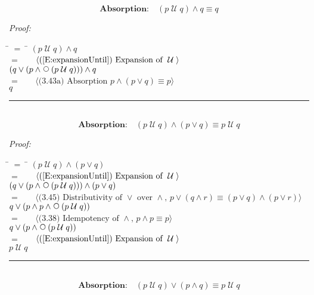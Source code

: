 \documentclass[fleqn, leqno]{article}
\newcommand{\lgap}{2pt}                             %
\newcommand{\mymathindent}{24pt}                    %
\newcommand{\Until}{\;\mathcal{U}\;}
\newcommand{\Next}{\;\,\text{\raisebox{3.5pt}{\circle{6}}}}
\newcommand{\myqed}{\hfill\rule[-.23ex]{1.2ex}{2.0ex}}
\newcommand{\Gll} {\langle}                         %
\newcommand{\Ggg} {\rangle}                         %
\newcommand{\Hint}[1]     {\ \ \ $\Gll              \mbox{#1} \Ggg$ }   %
\begin{document}
\begin{equation}\label{E:untilAndQ}
\textbf{Absorption:}\quad (p \Until q) \land q \equiv q
\end{equation}

\emph{Proof:}
\begin{tabbing}
\hspace{\mymathindent} \= $= \;$ \= \kill
  \> \>   $(p \Until q) \land q$\\[\lgap]
  \> $=$  \>  \Hint{(\ref{E:expansionUntil}) Expansion of $\Until$}\\[\lgap]
  \> \>   $(q \lor (p \land \Next(p \Until q))) \land q$\\[\lgap]
  \> $=$  \>  \Hint{(3.43a) Absorption $p \land (p \lor q) \equiv p$}\\[\lgap]
  \> \>   $q$
\end{tabbing}
\myqed\\[\lgap]

\begin{equation}\label{E:untilAndOr}
\textbf{Absorption:}\quad (p \Until q) \land (p \lor q) \equiv p \Until q
\end{equation}

\emph{Proof:}
\begin{tabbing}
\hspace{\mymathindent} \= $= \;$ \= \kill
  \> \>   $(p \Until q) \land (p \lor q)$\\[\lgap]
  \> $=$  \>  \Hint{(\ref{E:expansionUntil}) Expansion of $\Until$}\\[\lgap]
  \> \>   $(q \lor (p \land \Next(p \Until q))) \land (p \lor q)$\\[\lgap]
  \> $=$  \>  \Hint{(3.45) Distributivity of $\lor$ over $\land$, $p\lor (q\land r)\equiv (p\lor q)\land (p\lor r)$}\\[\lgap]
  \> \>   $q \lor (p \land p \land \Next(p \Until q))$\\[\lgap]
  \> $=$  \>  \Hint{(3.38) Idempotency of $\land$, $p \land p \equiv p$}\\[\lgap]
  \> \>   $q \lor (p \land \Next(p \Until q))$\\[\lgap]
  \> $=$  \>  \Hint{(\ref{E:expansionUntil}) Expansion of $\Until$}\\[\lgap]
  \> \>   $p \Until q$
\end{tabbing}
\myqed\\[\lgap]

\begin{equation}\label{E:untilOrAnd}
\textbf{Absorption:}\quad (p \Until q) \lor (p \land q) \equiv p \Until q
\end{equation}
\end{document}
